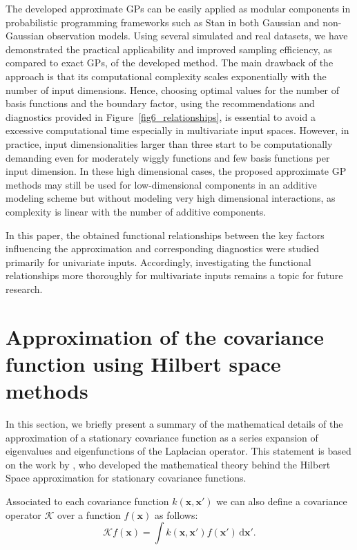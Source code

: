 The developed approximate GPs can be easily applied as modular components in probabilistic programming frameworks such as Stan in both Gaussian and non-Gaussian observation models. Using several simulated and real datasets, we have demonstrated the practical applicability and improved sampling efficiency, as compared to exact GPs, of the developed method. The main drawback of the approach is that its computational complexity scales exponentially with the number of input dimensions. Hence, choosing optimal values for the number of basis functions and the boundary factor, using the recommendations and diagnostics provided in Figure~\ref{fig6_relationships}, is essential to avoid a excessive computational time especially in multivariate input spaces. However, in practice, input dimensionalities larger than three start to be computationally demanding even for moderately wiggly functions and few basis functions per input dimension. In these high dimensional cases, the proposed approximate GP methods may still be used for low-dimensional components in an additive modeling scheme but without modeling very high dimensional interactions, as complexity is linear with the number of additive components.

In this paper, the obtained functional relationships between the key factors influencing the approximation and corresponding diagnostics were studied primarily for univariate inputs. Accordingly, investigating the functional relationships more thoroughly for multivariate inputs remains a topic for future research. 


\appendix


\section{Approximation of the covariance function using Hilbert space methods} \label{app_approx_covfun}

In this section, we briefly present a summary of the mathematical details of the approximation of a stationary covariance function as a series expansion of eigenvalues and eigenfunctions of the Laplacian operator. This statement is based on the work by \citet{solin2018hilbert}, who developed the mathematical theory behind the Hilbert Space approximation for stationary covariance functions.

Associated to each covariance function $k(\bm{x},\bm{x}')$ we can also define a covariance operator $\mathcal{K}$ over a function $f(\bm{x})$ as follows:
%
\begin{equation*}
\mathcal{K} f(\bm{x}) = \int k(\bm{x},\bm{x}') f(\bm{x}') \,\mathrm{d}\bm{x}'.
\end{equation*} 

